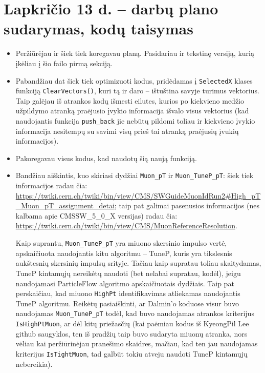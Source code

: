 \documentclass[a4paper, 12pt]{article}
\newcommand{\ttt}[1]{\texttt{#1}}
\begin{document}
\section{Lapkričio 13 d. -- darbų plano sudarymas, kodų taisymas}
\begin{itemize}
	\item Peržiūrėjau ir šiek tiek koregavau planą. Pasidariau ir tekstinę versiją, kurią įkėliau
	į šio failo pirmą sekciją.
	\item Pabandžiau dat šiek tiek optimizuoti kodus, pridėdamas į \ttt{SelectedX} klases funkciją
	\ttt{ClearVectors()}, kuri tą ir daro -- ištuština savyje turimus vektorius. Taip galėjau iš
	atrankos kodų išmesti eilutes, kurios po kiekvieno medžio užpildymo atranką praėjusio įvykio
	informacija išvalo visus vektorius (kad naudojantis funkcija \ttt{push\_back} jie nebūtų pildomi
	toliau ir kiekvieno įvykio informacija nesitempų su savimi visų prieš tai atranką praėjusių
	įvukių informacijos).
	\item Pakoregavau visus kodus, kad naudotų šią naują funkciją.
	\item Bandžiau aiškintis, kuo skiriasi dydžiai \ttt{Muon\_pT} ir \ttt{Muon\_TuneP\_pT}: šiek tiek
	informacijos radau čia:
	\url{https://twiki.cern.ch/twiki/bin/view/CMS/SWGuideMuonIdRun2#High_pT_Muon_pT_assignment_detai};
	taip pat galimai pasenusios informacijos (nes kalbama apie CMSSW\_5\_0\_X versijas) radau čia:
	\url{https://twiki.cern.ch/twiki/bin/view/CMS/MuonReferenceResolution}.
	
	Kaip suprantu, \ttt{Muon\_TuneP\_pT} yra miuono skersinio impulso vertė, apskaičiuota naudojantis
	kitu algoritmu -- TuneP, kuris yra tikslesnis aukštesnių skersinių impulsų srityje. Tačiau kaip
	supratau toliau skaitydamas, TuneP kintamųjų nereikėtų naudoti (bet nelabai supratau, kodėl),
	jeigu naudojamasi ParticleFlow algoritmo apskaičiuotais dydžiais. Taip pat perskaičiau, kad
	miuono \ttt{HighPt} identifikavimas atliekamas naudojantis TuneP algoritmu. Reikėtų pasiaiškinti,
	ar Dalmin'o koduose visur buvo naudojamas \ttt{Muon\_TuneP\_pT} todėl, kad buvo naudojamas
	atrankos kriterijus \ttt{IsHighPtMuon},	ar dėl kitų priežasčių (kai paėmiau kodus iš KyeongPil
	Lee github saugyklos, ten iš pradžių taip	buvo sudaryta miuonų atranka, nors vėliau kai
	peržiūrinėjau pranešimo skaidres, mačiau, kad ten	jau naudojamas kriterijus \ttt{IsTightMuon}, 
	tad galbūt tokiu atveju naudoti TuneP kintamųjų	nebereikia).
\end{itemize}




\end{document}
